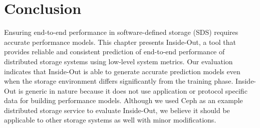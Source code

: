 \section{Conclusion}
\label{sec:conclusion}

Ensuring end-to-end performance in software-defined storage (SDS) requires accurate performance models. This chapter presents Inside-Out, a tool that provides reliable and consistent prediction of end-to-end performance of distributed storage systems using low-level system metrics. Our evaluation indicates that Inside-Out is able to generate accurate prediction models even when the storage environment differs significantly from the training phase. Inside-Out is generic in nature because it does not use application or protocol specific data for building performance models. Although we used Ceph as an example distributed storage service to evaluate Inside-Out, we believe it should be applicable to other storage systems as well with minor modifications.